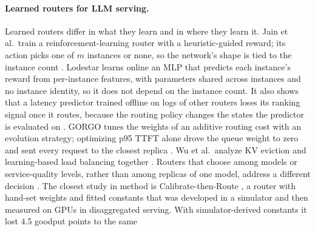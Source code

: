 \paragraph{Learned routers for LLM serving.}
Learned routers differ in what they learn and in where they learn it.
Jain et al.\ train a reinforcement-learning router with a heuristic-guided reward; its action
picks one of $m$ instances or none, so the network's shape is tied to the instance count
\citep{jain2024intelligent}.
Lodestar learns online an MLP that predicts each instance's reward from per-instance features,
with parameters shared across instances and no instance identity, so it does not depend on the
instance count. It also shows that a latency predictor trained offline on logs of other routers
loses its ranking signal once it routes, because the routing policy changes the states the
predictor is evaluated on \citep{lim2026lodestar}.
GORGO tunes the weights of an additive routing cost with an evolution strategy; optimizing p95
TTFT alone drove the queue weight to zero and sent every request to the closest replica
\citep{toniolo2026gorgo}.
Wu et al.\ analyze KV eviction and learning-based load balancing together
\citep{wu2026randomization}.
Routers that choose among models or service-quality levels, rather than among replicas of one
model, address a different decision \citep{jha2024learned,da2026routebalance}.
The closest study in method is Calibrate-then-Route \citep{tumkur2026calibrate}, a router with
hand-set weights and fitted constants that was developed in a simulator and then measured on GPUs
in disaggregated serving. With simulator-derived constants it lost 4.5 goodput points to the same
